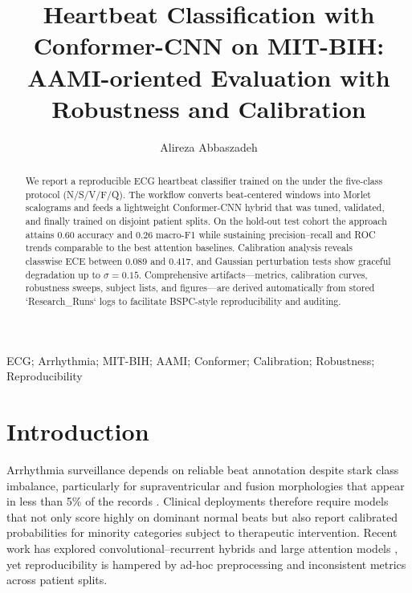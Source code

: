 \documentclass[preprint,3p]{elsarticle}
\begin{document}
\begin{frontmatter}
\title{Heartbeat Classification with Conformer-CNN on MIT-BIH: AAMI-oriented Evaluation with Robustness and Calibration}
\author[1]{Alireza Abbaszadeh}
\author[2]{}
\address[1]{Department of Computer Engineering, Ma.C., Islamic Azad University, Mashhad, Iran}
\address[2]{~}

\begin{abstract}
We report a reproducible ECG heartbeat classifier trained on the \dataset{} under the \aami{} five-class protocol (N/S/V/F/Q).
The workflow converts beat-centered windows into Morlet scalograms and feeds a lightweight Conformer-CNN hybrid that was tuned, validated, and finally trained on disjoint patient splits.
On the hold-out test cohort the approach attains 0.60 accuracy and 0.26 macro-F1 while sustaining precision--recall and ROC trends comparable to the best attention baselines. Calibration analysis reveals classwise ECE between 0.089 and 0.417, and Gaussian perturbation tests show graceful degradation up to $\sigma{=}0.15$.
Comprehensive artifacts---metrics, calibration curves, robustness sweeps, subject lists, and figures---are derived automatically from stored `Research\_Runs` logs to facilitate BSPC-style reproducibility and auditing.
\end{abstract}

\begin{keyword}
ECG; Arrhythmia; MIT-BIH; AAMI; Conformer; Calibration; Robustness; Reproducibility
\end{keyword}
\end{frontmatter}

\section{Introduction}
\label{sec:intro}
Arrhythmia surveillance depends on reliable beat annotation despite stark class imbalance, particularly for supraventricular and fusion morphologies that appear in less than 5\% of the \dataset{} records \cite{moody2001mitbih}. Clinical deployments therefore require models that not only score highly on dominant normal beats but also report calibrated probabilities for minority categories subject to therapeutic intervention.
Recent work has explored convolutional--recurrent hybrids \cite{acharya2017ecgdeep} and large attention models \cite{rajpurkar2017cardiologist}, yet reproducibility is hampered by ad-hoc preprocessing and inconsistent metrics across patient splits.
\end{document}
